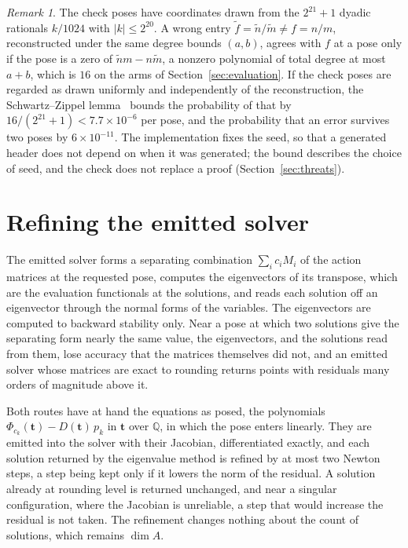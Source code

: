 \documentclass[11pt,a4paper]{article}
\theoremstyle{plain}
\theoremstyle{definition}
\theoremstyle{remark}
\newtheorem{remark}[proposition]{Remark}
\newcommand{\QQ}{\mathbb{Q}}
\newcommand{\bt}{\boldsymbol{t}}
\begin{document}
\begin{remark}
\label{rem:probability}
The check poses have coordinates drawn from the $2^{21}+1$ dyadic rationals $k/1024$ with
$|k| \le 2^{20}$. A wrong entry $\tilde f = \tilde n/\tilde m \neq f = n/m$, reconstructed under the
same degree bounds $(a, b)$, agrees with $f$ at a pose only if the pose is a zero of
$\tilde n m - n \tilde m$, a nonzero polynomial of total degree at most $a + b$, which is $16$ on the
arms of Section~\ref{sec:evaluation}. If the check poses are regarded as drawn uniformly and
independently of the reconstruction, the Schwartz--Zippel lemma~\cite{schwartz1980,zippel1979} bounds
the probability of that by $16/(2^{21}+1) < 7.7 \times 10^{-6}$ per pose, and the probability that an
error survives two poses by $6 \times 10^{-11}$. The implementation fixes the seed, so that a
generated header does not depend on when it was generated; the bound describes the choice of seed,
and the check does not replace a proof (Section~\ref{sec:threats}).
\end{remark}

\section{Refining the emitted solver}
\label{sec:refinement}

The emitted solver forms a separating combination $\sum_i c_i M_i$ of the action matrices at the
requested pose, computes the eigenvectors of its transpose, which are the evaluation functionals at the
solutions, and reads each solution off an eigenvector through the normal forms of the variables. The
eigenvectors are computed to backward stability only. Near a pose at which two solutions give the
separating form nearly the same value, the eigenvectors, and the solutions read from them, lose
accuracy that the matrices themselves did not, and an emitted solver whose matrices are exact to
rounding returns points with residuals many orders of magnitude above it.

Both routes have at hand the equations as posed, the polynomials
$\Phi_{c_k}(\bt) - D(\bt)\,p_k$ in $\bt$ over $\QQ$, in which the pose enters linearly. They
are emitted into the solver with their Jacobian, differentiated exactly, and each solution returned by
the eigenvalue method is refined by at most two Newton steps, a step being kept only if it lowers the
norm of the residual. A solution already at rounding level is returned unchanged, and near a singular
configuration, where the Jacobian is unreliable, a step that would increase the residual is not taken.
The refinement changes nothing about the count of solutions, which remains $\dim A$.
\end{document}
